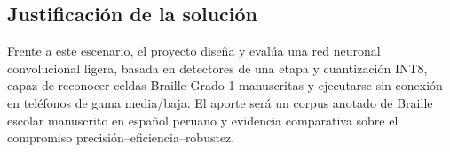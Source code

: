 \subsection{Justificación de la solución}
Frente a este escenario, el proyecto diseña y evalúa una red neuronal
convolucional ligera, basada en detectores de una etapa y cuantización INT8,
capaz de reconocer celdas Braille Grado 1 manuscritas y ejecutarse sin conexión
en teléfonos de gama media/baja. El aporte será un corpus anotado de Braille
escolar manuscrito en español peruano y evidencia comparativa sobre el
compromiso precisión--eficiencia--robustez.
